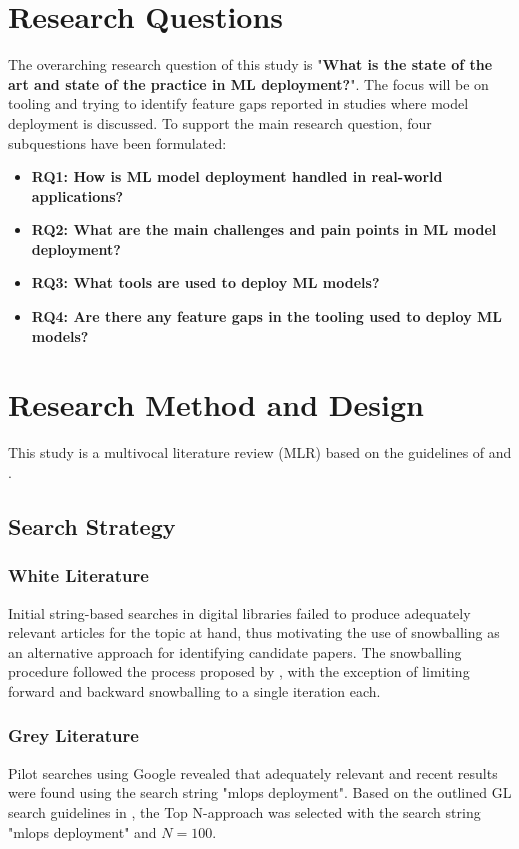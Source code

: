 \section{Research Questions}
\label{sec:research_questions}
The overarching research question of this study is "\textbf{What is the state of the art and state of the practice in ML deployment?}".
The focus will be on tooling and trying to identify feature gaps reported in studies where model deployment is discussed.
To support the main research question, four subquestions have been formulated:
\begin{itemize}
    \item \textbf{RQ1: How is ML model deployment handled in real-world applications?}
    \item \textbf{RQ2: What are the main challenges and pain points in ML model deployment?}
    \item \textbf{RQ3: What tools are used to deploy ML models?}
    \item \textbf{RQ4: Are there any feature gaps in the tooling used to deploy ML models?}
\end{itemize}

\section{Research Method and Design}
\label{sec:research_method}
This study is a multivocal literature review (MLR) based on the guidelines of \textcite{Kitchenham07guidelinesfor} and \textcite{Garousi2019}.

\subsection{Search Strategy}
\subsubsection{White Literature}
Initial string-based searches in digital libraries failed to produce adequately relevant articles for the topic at hand, thus motivating the use of snowballing as an alternative approach for identifying candidate papers.
The snowballing procedure followed the process proposed by \textcite{Wohlin2014}, with the exception of limiting forward and backward snowballing to a single iteration each.

\subsubsection{Grey Literature}
Pilot searches using Google revealed that adequately relevant and recent results were found using the search string "mlops deployment".
Based on the outlined GL search guidelines in \cite{Garousi2016}, the Top N-approach was selected with the search string "mlops deployment" and $N=100$.


